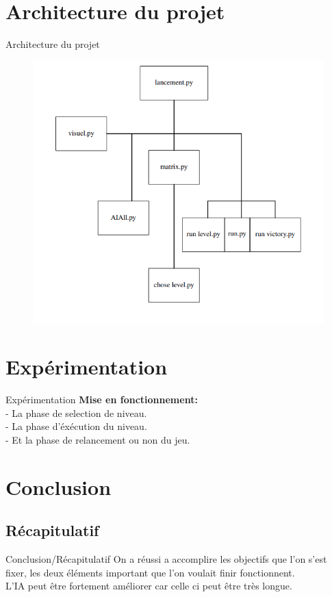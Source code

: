 \documentclass{beamer}
\begin{document}
\section{Architecture du projet}
\begin{frame}{Architecture du projet}
\begin{figure}
        \centering
        \includegraphics[scale=0.5]{../picture/archi.png}
\end{figure}

\end{frame}

\section{Expérimentation}
\begin{frame}{Expérimentation}
\textbf{Mise en fonctionnement:} \\
- La phase de selection de niveau. \\
- La phase d'éxécution du niveau.\\
- Et la phase de relancement ou non du jeu. \\
\end{frame}


\section{Conclusion}
\subsection{Récapitulatif}
\begin{frame}{Conclusion/Récapitulatif}
On a réussi a accomplire les objectifs que l'on s'est fixer, les deux éléments important que l'on voulait finir fonctionnent. \\
L'IA  peut être fortement améliorer car celle  ci peut être très longue.

\end{frame}
\end{document}
